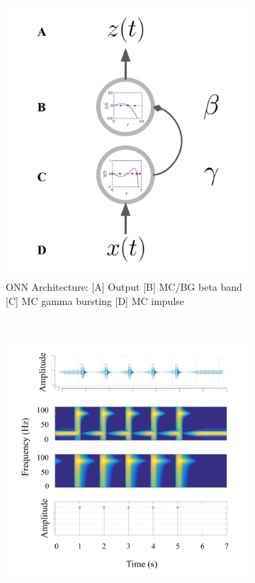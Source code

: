 \documentclass[12pt]{article}
\begin{document}
\begin{figure}
    \centering
    \begin{subfigure}[t]{0.35\textwidth}
        \includegraphics[width=\textwidth]{model1}
        \caption{ONN Architecture: [A] Output [B] MC/BG beta band [C] MC gamma bursting [D] MC impulse}
        \label{fig:arch}
    \end{subfigure}
    ~ %
    \quad \quad \quad \quad
    \begin{subfigure}[t]{0.41\textwidth}
        \includegraphics[width=\textwidth]{iso_stim}

\end{subfigure}
\end{figure}
\end{document}

